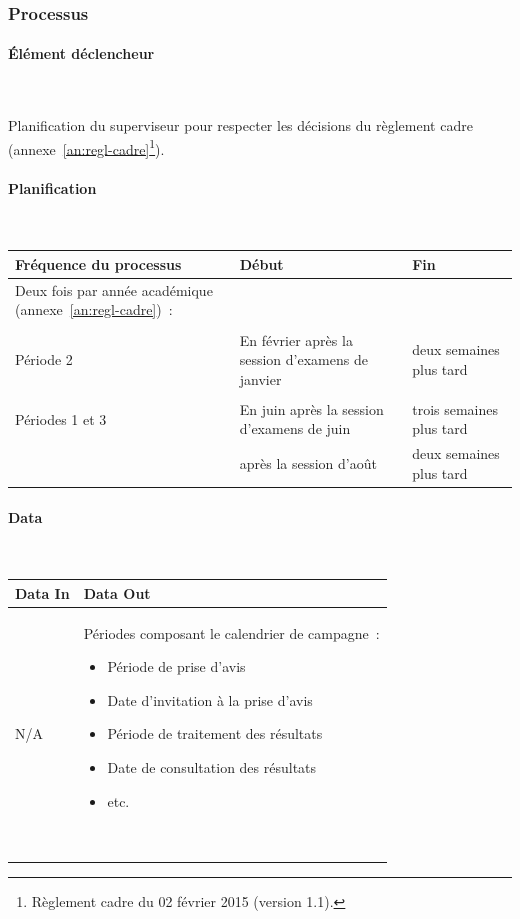 \documentclass[a4paper,11pt]{report}
\begin{document}
\subsubsection{Processus}
\paragraph{Élément déclencheur}~\newline{}

Planification du superviseur pour respecter les décisions du règlement cadre (annexe~\ref{an:regl-cadre}\footnote{Règlement cadre du 02 février 2015 (version 1.1).}).

\paragraph{Planification}\label{sec:calendrier-processus-plan}~\newline{}

\begin{tabularx}{\linewidth}{|X|X|X|} \hline
Fréquence du processus & Début & Fin \\ \hline
Deux fois par année académique (annexe~\ref{an:regl-cadre})~: & & \\
& & \\
Période 2 & En février après la session d'examens de janvier & deux semaines plus tard \\
& & \\ %
Périodes 1 et 3 & En juin après la session d'examens de juin & trois semaines plus tard \\
& après la session d'août & deux semaines plus tard \\ \hline
\end{tabularx}

\paragraph{Data}~\newline{}

\begin{tabularx}{\linewidth}{|X|X|} \hline
Data In & Data Out \\ \hline
N/A & Périodes composant le calendrier de campagne~:
\begin{itemize}
	\item Période de prise d'avis
	\item Date d'invitation à la prise d'avis
	\item Période de traitement des résultats
	\item Date de consultation des résultats
	\item etc.
\end{itemize}
~\\ \hline
\end{tabularx}
\end{document}
